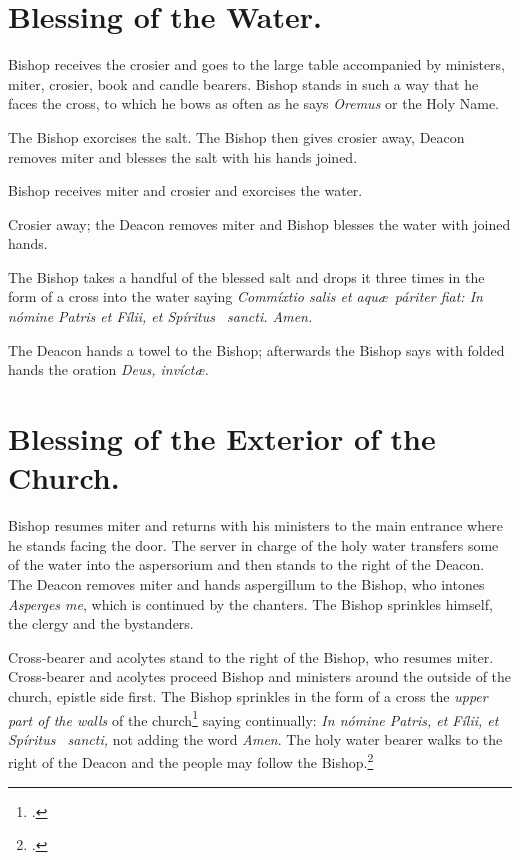 \documentclass[letterpaper]{report}
\begin{document}
{\section{Blessing of the Water.}

\rubric Bishop receives the crosier and goes to the large table accompanied by
ministers, miter, crosier, book and candle bearers. Bishop stands in such a way
that he faces the cross, to which he bows as often as he says \textit{Oremus}
or the Holy Name.

\rubric The Bishop exorcises the salt. The Bishop then gives crosier away,
Deacon removes miter and blesses the salt with his hands joined.

\rubric Bishop receives miter and crosier and exorcises the water.

\rubric Crosier away; the Deacon removes miter and Bishop blesses the water
with joined hands.

\rubric The Bishop takes a handful of the blessed salt and drops it three times
in the form of a cross into the water saying \textit{Commíxtio salis et aqu\ae\
páriter fiat: In nómine Pa\cross tris et Fí\cross lii, et Spíritus \cross\
sancti. \rbar Amen.}

\rubric The Deacon hands a towel to the Bishop; afterwards the Bishop says with
folded hands the oration \textit{Deus, invíct\ae.}

\section{Blessing of the Exterior of the Church.}

\rubric Bishop resumes miter and returns with his ministers to the main
entrance where he stands facing the door. The server in charge of the holy
water transfers some of the water into the aspersorium and then stands to the
right of the Deacon. The Deacon removes miter and hands aspergillum to the Bishop,
who intones \textit{Asperges me}, which is continued by the chanters. The
Bishop sprinkles himself, the clergy and the bystanders.

\rubric Cross-bearer and acolytes stand to the right of the Bishop, who resumes
miter. Cross-bearer and acolytes proceed Bishop and ministers around the
outside of the church, epistle side first. The Bishop sprinkles in the form of
a cross the \textit{upper part of the walls} of the church\footcite[The
procession walks around and Bishop sprinkles the cemetery also if it be
adjacent.][n. 41, p. 44.]{consecranda} saying continually: \textit{In nómine
Pa\cross tris, et Fí\cross lii, et Spíritus \cross\ sancti,} not adding the
word \textit{Amen}. The holy water bearer walks to the right of the Deacon and
the people may follow the Bishop.\footcite[If it is impossible to go around the
church, he sprinkles the wall at his right as far as he can, then, passing by
the front of the church, he goes to the place at the other side of the church
nearest the point at which he stoped on the right side and begins to sprinkle
the walls from that point until he arrives at the main portal.][note 2, p.
44.]{consecranda}

}
\end{document}
